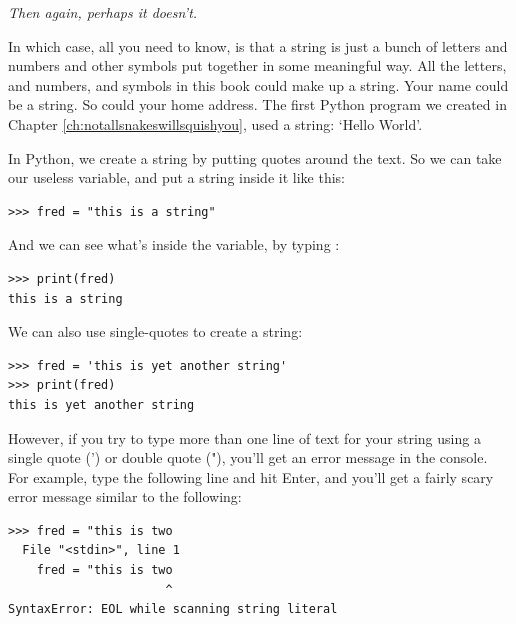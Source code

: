 \noindent
\emph{Then again, perhaps it doesn't.}

In which case, all you need to know, is that a string is just a bunch of letters and numbers and other symbols put together in some meaningful way. All the letters, and numbers, and symbols in this book could make up a string.  Your name could be a string.  So could your home address.  The first Python program we created in Chapter \ref{ch:notallsnakeswillsquishyou}, used a string: `Hello World'.
\par
In Python, we create a string by putting quotes around the text.  So we can take our useless  variable, and put a string inside it like this:

\begin{listing}
\begin{verbatim}
>>> fred = "this is a string"
\end{verbatim}
\end{listing}

\noindent
And we can see what's inside the  variable, by typing :

\begin{listing}
\begin{verbatim}
>>> print(fred)
this is a string
\end{verbatim}
\end{listing}

\noindent
We can also use single-quotes to create a string:

\begin{listing}
\begin{verbatim}
>>> fred = 'this is yet another string'
>>> print(fred)
this is yet another string
\end{verbatim}
\end{listing}

However, if you try to type more than one line of text for your string using a single quote (') or double quote ("), you'll get an error message in the console. For example, type the following line and hit Enter, and you'll get a fairly scary error message similar to the following:

\begin{listing}
\begin{verbatim}
>>> fred = "this is two
  File "<stdin>", line 1
    fred = "this is two
                      ^
SyntaxError: EOL while scanning string literal
\end{verbatim}
\end{listing}

